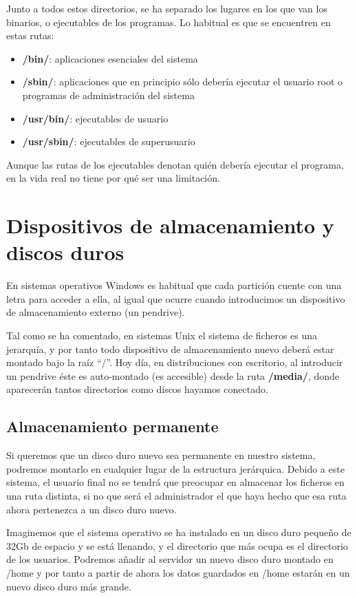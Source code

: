 \documentclass{../../../yukibook.cls/yukibook}
\begin{document}
Junto a todos estos directorios, se ha separado los lugares en los que van los binarios, o ejecutables de los programas. Lo habitual es que se encuentren en estas rutas:

\begin{itemize}
    \item \textbf{/bin/}: aplicaciones esenciales del sistema
    \item \textbf{/sbin/}: aplicaciones que en principio sólo debería ejecutar el usuario root o programas de administración del sistema
    \item \textbf{/usr/bin/}: ejecutables de usuario
    \item \textbf{/usr/sbin/}: ejecutables de superusuario
\end{itemize}
Aunque las rutas de los ejecutables denotan quién debería ejecutar el programa, en la vida real no tiene por qué ser una limitación.

\section{Dispositivos de almacenamiento y discos duros}
En sistemas operativos Windows es habitual que cada partición cuente con una letra para acceder a ella, al igual que ocurre cuando introducimos un dispositivo de almacenamiento externo (un pendrive).

Tal como se ha comentado, en sistemas Unix el sistema de ficheros es una jerarquía, y por tanto todo dispositivo de almacenamiento nuevo deberá estar montado bajo la raíz “/”. Hoy día, en distribuciones con escritorio, al introducir un pendrive éste es auto-montado (es accesible) desde la ruta \textbf{/media/}, donde aparecerán tantos directorios como discos hayamos conectado.

\subsection{Almacenamiento permanente}
Si queremos que un disco duro nuevo sea permanente en nuestro sistema, podremos montarlo en cualquier lugar de la estructura jerárquica. Debido a este sistema, el usuario final no se tendrá que preocupar en almacenar los ficheros en una ruta distinta, si no que será el administrador el que haya hecho que esa ruta ahora pertenezca a un disco duro nuevo.

Imaginemos que el sistema operativo se ha instalado en un disco duro pequeño de 32Gb de espacio y se está llenando, y el directorio que más ocupa es el directorio de los usuarios. Podremos añadir al servidor un nuevo disco duro montado en /home y por tanto a partir de ahora los datos guardados en /home estarán en un nuevo disco duro más grande.
\end{document}
